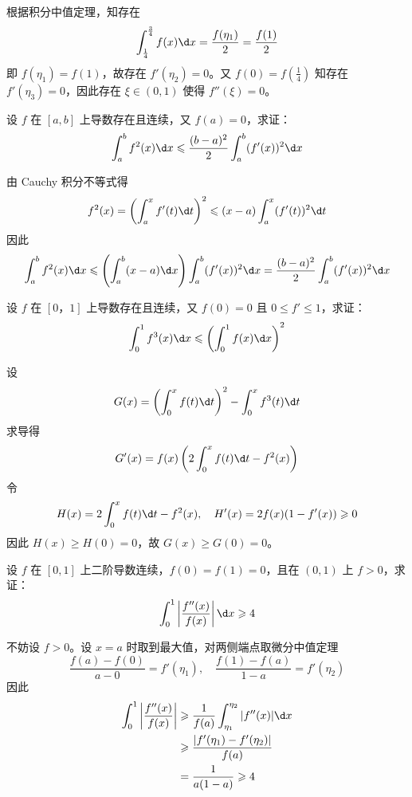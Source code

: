 \begin{solution}
	根据积分中值定理，知存在
	\[ \int_{\frac{1}{4}}^{\frac{3}{4}} f(x) \d x = \frac{f(\eta_1)}{2} = \frac{f(1)}{2} \]
	即 $f(\eta_1) = f(1)$，故存在 $f'(\eta_2) = 0$。又 $f(0) = f(\frac{1}{4})$ 知存在 $f'(\eta_3) = 0$，因此存在 $\xi \in (0, 1)$ 使得 $f''(\xi) = 0$。
\end{solution}

\begin{problem}[000056]
设 $f$ 在 $[a, b]$ 上导数存在且连续，又 $f(a) = 0$，求证：
\[ \int_{a}^{b} f^2(x) \d x \leqslant \frac{(b-a)^2}{2} \int_{a}^{b} (f'(x))^2 \d x \]
\end{problem}

\begin{solution}
	由 Cauchy 积分不等式得
	\[
		f^2(x)  = \left(\int_{a}^{x} f'(t) \d t\right)^2
		\leqslant (x-a) \int_{a}^{x} (f'(t))^2 \d t
	\]
	因此
	\[ \int_{a}^{b} f^2(x) \d x \leqslant \left(\int_{a}^{b} (x-a) \d x \right) \int_{a}^{b} (f'(x))^2 \d x = \frac{(b-a)^2}{2} \int_{a}^{b} (f'(x))^2 \d x \]
\end{solution}

\begin{problem}[000057]
设 $f$ 在 $[0， 1]$ 上导数存在且连续，又 $f(0) = 0$ 且 $0 \leqslant f' \leqslant 1$，求证：
\[ \int_{0}^{1} f^3(x) \d x \leqslant \left(\int_{0}^{1} f(x) \d x\right)^2 \]
\end{problem}

\begin{solution}
	设
	\[ G(x) =  \left(\int_{0}^{x} f(t) \d t\right)^2 - \int_{0}^{x} f^3(t) \d t \]
	求导得
	\[ G'(x) = f(x) \left(2 \int_{0}^{x} f(t) \d t - f^2(x)\right) \]
	令
	\[ H(x) = 2 \int_{0}^{x} f(t) \d t - f^2(x), \quad H'(x) = 2f(x)(1 - f'(x)) \geqslant 0 \]
	因此 $H(x) \geqslant H(0) = 0$，故 $G(x) \geqslant G(0) = 0$。
\end{solution}

\begin{problem}[000058]
设 $f$ 在 $[0, 1]$ 上二阶导数连续，$f(0) = f(1) = 0$，且在 $(0, 1)$ 上 $f > 0$，求证：
\[ \int_{0}^{1} \left|\frac{f''(x)}{f(x)}\right| \d x \geqslant 4 \]
\end{problem}

\begin{solution}
	不妨设 $f > 0$。设 $x = a$ 时取到最大值，对两侧端点取微分中值定理
	\[ \frac{f(a) - f(0)}{a - 0} = f'(\eta_1), \quad \frac{f(1) - f(a)}{1 - a} = f'(\eta_2) \]
	因此
	\[ \begin{aligned}
			\int_{0}^{1} \left|\frac{f''(x)}{f(x)}\right|
			 & \geqslant \frac{1}{f(a)} \int_{\eta_1}^{\eta_2} |f''(x)| \d x \\
			 & \geqslant \frac{|f'(\eta_1) - f'(\eta_2)|}{f(a)}              \\
			 & = \frac{1}{a(1-a)} \geqslant 4
		\end{aligned} \]
\end{solution}


